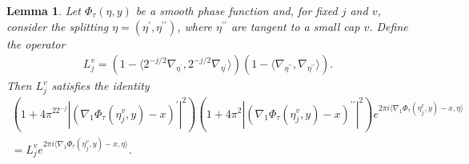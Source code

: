 \documentclass[10pt,a4paper]{amsart}
\newtheorem{lemma}{Lemma}
\begin{document}
\begin{lemma}
    Let $\Phi_\tau(\eta,y)$ be a smooth phase function and, for fixed $j$ and $v$, consider the splitting $\eta = (\eta^{\prime},\eta^{\prime\prime})$, where $\eta^{\prime\prime}$ are tangent to a small cap $v$. Define the operator
\begin{align*}
L^v_j=(1-\langle2^{-j/2}\nabla_{{\eta}^{\prime}},2^{-j/2}\nabla_{{\eta}^{\prime}}\rangle)(1-\langle\nabla_{{\eta}^{\prime\prime}},\nabla_{{\eta}^{\prime\prime}}\rangle).
\end{align*}
Then $L_j^v$ satisfies the identity
\begin{align*}
     (1+4\pi^22^{-j}|( \nabla_1\Phi_{\tau}(\eta_j^v,y)-x)^{\prime}|^2)(1+4\pi^2|( \nabla_1\Phi_{\tau}(\eta_j^v,y)-x)^{\prime\prime}|^2)e^{2\pi i \langle \nabla_1\Phi_{\tau}(\eta_j^v,y)-x,\eta\rangle}\\
     =L^v_je^{2\pi i \langle \nabla_1\Phi_{\tau}(\eta_j^v,y)-x,\eta\rangle}.
\end{align*}
\end{lemma}
\end{document}
